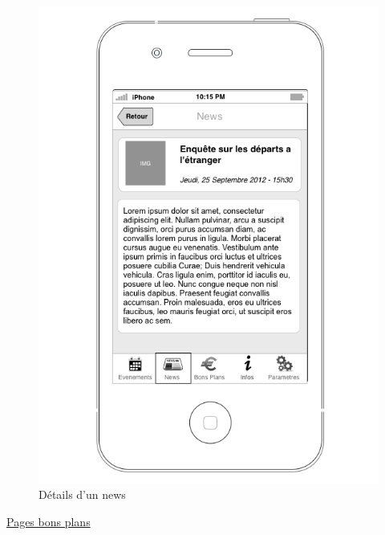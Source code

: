 \documentclass[a4paper, 11px]{article}
\begin{document}
\begin{figure}[h!]
\begin{minipage}[c]{.50\linewidth}
	\end{minipage}
	\hfill
	\begin{minipage}[c]{.50\linewidth}
		\begin{center}
			\includegraphics[scale=0.3]{../../Sketch/iOS/news_detail.png}
		\end{center}
	\caption{Détails d'un news}
	\end{minipage}
\end{figure}
\vfill
\clearpage
\underline{Pages bons plans}
\end{document}
